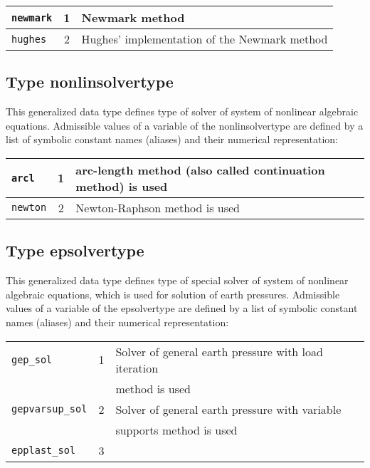 \begin{center}
\begin{tabular}{|l|c|l|}
\hline
{\tt newmark} & 1 & Newmark method \index{method!Newmark}
\\ \hline
{\tt hughes} & 2 & Hughes' implementation of the Newmark method
\\ \hline
\end{tabular}
\end{center}

\subsection{Type {\sf nonlinsolvertype}}
\label{sectnonlinsolvertype}

This generalized data type defines type of solver of system of nonlinear algebraic equations.
Admissible values of a variable of the {\sf nonlinsolvertype} are defined by a list of symbolic constant names (aliases)
and their numerical representation:

\begin{center}
\begin{tabular}{|l|c|l|}
\hline
{\tt arcl} & 1 & arc-length method (also called continuation method) is used \index{method!arc-lenght}
\\ \hline
{\tt newton} & 2 & Newton-Raphson method is used \index{method!Newton-Raphson}
\\ \hline
\end{tabular}
\end{center}

\subsection{Type {\sf epsolvertype}}
\label{sectepsolvertype}

This generalized data type defines type of special solver of system of nonlinear algebraic equations, which is used
for solution of earth pressures. Admissible values of a variable of the {\sf epsolvertype} are defined by a list of
symbolic constant names (aliases) and their numerical representation:

\begin{center}
\begin{tabular}{|l|c|l|}
\hline
{\tt gep\_sol} & 1 & Solver of general earth pressure with load iteration
\\
 & & method is used
\\ \hline
{\tt gepvarsup\_sol} & 2 & Solver of general earth pressure with variable
\\
 & & supports method is used
\\ \hline
{\tt epplast\_sol} & 3 &
\\ \hline
\end{tabular}
\end{center}

